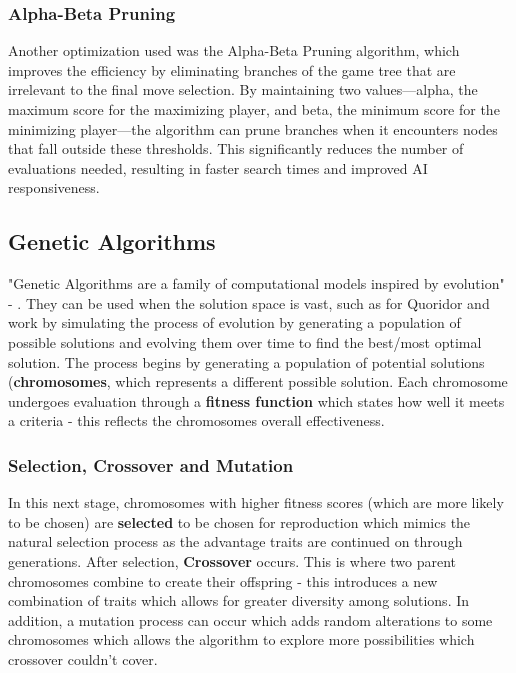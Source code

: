 \documentclass[review]{cmpreport}
\begin{document}
\subsubsection{Alpha-Beta Pruning}
Another optimization used was the Alpha-Beta Pruning algorithm, which improves the efficiency by eliminating branches of the game tree that are irrelevant to the final move selection. By maintaining two values—alpha, the maximum score for the maximizing player, and beta, the minimum score for the minimizing player—the algorithm can prune branches when it encounters nodes that fall outside these thresholds. This significantly reduces the number of evaluations needed, resulting in faster search times and improved AI responsiveness.

\subsection{Genetic Algorithms}
"Genetic Algorithms are a family of computational models inspired by evolution" - \cite{mathew2012genetic}. They can be used when the solution space is vast, such as for Quoridor and work by simulating the process of evolution by generating a population of possible solutions and evolving them over time to find the best/most optimal solution. The process begins by generating a population of potential solutions (\textbf{chromosomes}, which represents a different possible solution. Each chromosome undergoes evaluation through a \textbf{fitness function} which states how well it meets a criteria - this reflects the chromosomes overall effectiveness.

\subsubsection{Selection, Crossover and Mutation}
In this next stage, chromosomes with higher fitness scores (which are more likely to be chosen) are \textbf{selected} to be chosen for reproduction which mimics the natural selection process as the advantage traits are continued on through generations. After selection, \textbf{Crossover} occurs. This is where two parent chromosomes combine to create their offspring - this introduces a new combination of traits which allows for greater diversity among solutions. In addition, a mutation process can occur which adds random alterations to some chromosomes which allows the algorithm to explore more possibilities which crossover couldn't cover. \newline
\end{document}
